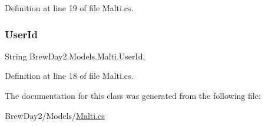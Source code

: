 Definition at line 19 of file Malti.\+cs.

\mbox{\label{class_brew_day2_1_1_models_1_1_malti_a414f26850a0621fa52920477da285cfd}} 
\subsubsection{\texorpdfstring{User\+Id}{UserId}}
{\footnotesize\ttfamily String Brew\+Day2.\+Models.\+Malti.\+User\+Id\hspace{0.3cm}{\ttfamily [get]}, {\ttfamily [set]}}



Definition at line 18 of file Malti.\+cs.



The documentation for this class was generated from the following file\+:\begin{DoxyCompactItemize}
\item 
Brew\+Day2/\+Models/\mbox{\hyperlink{_malti_8cs}{Malti.\+cs}}\end{DoxyCompactItemize}
